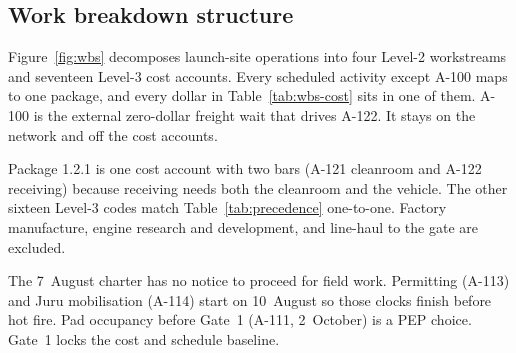 \subsection{Work breakdown structure}
\label{sec:overview-wbs}

Figure~\ref{fig:wbs} decomposes launch-site operations into four Level-2 workstreams and seventeen Level-3 cost accounts. Every scheduled activity except A-100 maps to one package, and every dollar in Table~\ref{tab:wbs-cost} sits in one of them. A-100 is the external zero-dollar freight wait that drives A-122. It stays on the network and off the cost accounts.

Package 1.2.1 is one cost account with two bars (A-121 cleanroom and A-122 receiving) because receiving needs both the cleanroom and the vehicle. The other sixteen Level-3 codes match Table~\ref{tab:precedence} one-to-one. Factory manufacture, engine research and development, and line-haul to the gate are excluded.

The 7~August charter has no notice to proceed for field work. Permitting (A-113) and Juru mobilisation (A-114) start on 10~August so those clocks finish before hot fire. Pad occupancy before Gate~1 (A-111, 2~October) is a PEP choice. Gate~1 locks the cost and schedule baseline.

